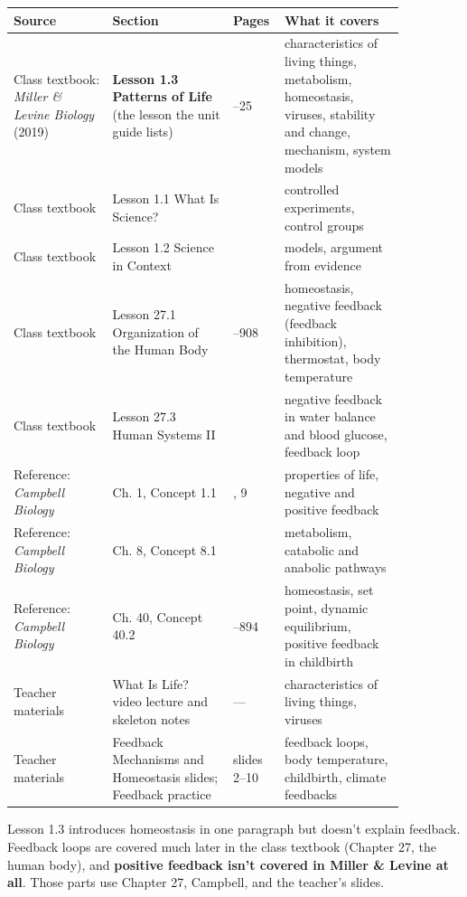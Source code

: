 \documentclass[11pt,letterpaper]{article}
\begin{document}
\begin{longtable}{@{}>{\raggedright\arraybackslash}p{0.23\linewidth}>{\raggedright\arraybackslash}p{0.28\linewidth}>{\raggedright\arraybackslash}p{0.07\linewidth}>{\raggedright\arraybackslash}p{0.28\linewidth}@{}}
\toprule
Source & Section & Pages & What it covers \\
\midrule
\endhead
Class textbook: \emph{Miller \& Levine Biology} (2019) & \textbf{Lesson 1.3 Patterns of Life} (the lesson the unit guide lists) & 22–25 & characteristics of living things, metabolism, homeostasis, viruses, stability and change, mechanism, system models \\
Class textbook & Lesson 1.1 What Is Science? & 12 & controlled experiments, control groups \\
Class textbook & Lesson 1.2 Science in Context & 21 & models, argument from evidence \\
Class textbook & Lesson 27.1 Organization of the Human Body & 907–908 & homeostasis, negative feedback (feedback inhibition), thermostat, body temperature \\
Class textbook & Lesson 27.3 Human Systems II & 932 & negative feedback in water balance and blood glucose, feedback loop \\
Reference: \emph{Campbell Biology} & Ch. 1, Concept 1.1 & 3, 9 & properties of life, negative and positive feedback \\
Reference: \emph{Campbell Biology} & Ch. 8, Concept 8.1 & 146 & metabolism, catabolic and anabolic pathways \\
Reference: \emph{Campbell Biology} & Ch. 40, Concept 40.2 & 893–894 & homeostasis, set point, dynamic equilibrium, positive feedback in childbirth \\
Teacher materials & What Is Life? video lecture and skeleton notes & — & characteristics of living things, viruses \\
Teacher materials & Feedback Mechanisms and Homeostasis slides; Feedback practice & slides 2–10 & feedback loops, body temperature, childbirth, climate feedbacks \\
\bottomrule
\end{longtable}

Lesson 1.3 introduces homeostasis in one paragraph but doesn't explain feedback. Feedback loops are covered much later in the class textbook (Chapter 27, the human body), and \textbf{positive feedback isn't covered in Miller \& Levine at all}. Those parts use Chapter 27, Campbell, and the teacher's slides.
\end{document}

